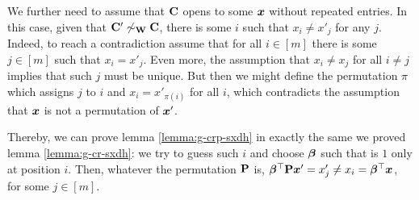 We further need to assume that $\mathbf{{C}}$ opens to some ${\boldsymbol{x}}$ without repeated entries. In this case, given that $\mathbf{{C}}'\not\sim_{\mathbf{{W}}}\mathbf{{C}}$, there is some $i$ such that $x_i\neq x'_j$ for any $j$. Indeed, to reach a contradiction assume that for all $i\in[m]$ there is some $j\in[m]$ such that $x_i=x'_j$. Even more, the assumption that $x_i\neq x_j$ for all $i\neq j$ implies that such $j$ must be unique. But then we might define the permutation $\pi$ which assigns $j$ to $i$ and $x_i = x'_{\pi(i)}$ for all $i$, which contradicts the assumption that ${\boldsymbol{x}}$ is not a permutation of ${\boldsymbol{x}}'$.

Thereby, we can prove lemma \ref{lemma:g-crp-sxdh} in exactly the same  we proved lemma \ref{lemma:g-cr-sxdh}: we try to guess such $i$ and choose ${\boldsymbol{\beta}}$ such that is $1$ only at position $i$. Then, whatever the permutation $\mathbf{{P}}$ is, ${\boldsymbol{\beta}}^\top\mathbf{{P}}{\boldsymbol{x}}' = x'_j \neq x_i = {\boldsymbol{\beta}}^\top{\boldsymbol{x}}$, for some $j\in[m]$.

